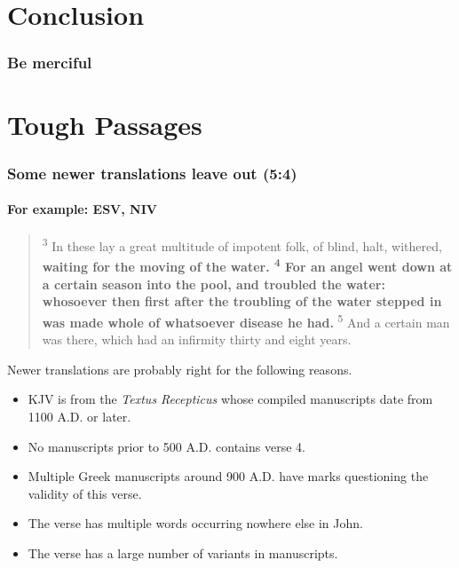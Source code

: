 \section*{Conclusion}
\begin{frame}
\frametitle{Be merciful}
\end{frame}

\section*{Tough Passages}
\begin{frame}
\frametitle{Some newer translations leave out (5:4)}
\framesubtitle{For example: ESV, NIV}

\footnotesize  
\begin{quote}
\textsuperscript{3} In these lay a great multitude of impotent folk, of blind, halt, withered, \textbf{waiting for the moving of the water. \textsuperscript{4} For an angel went down at a certain season into the pool, and troubled the water: whosoever then first after the troubling of the water stepped in was made whole of whatsoever disease he had.} \textsuperscript{5} And a certain man was there, which had an infirmity thirty and eight years.

\end{quote}
\normalsize 
Newer translations are probably right for the following reasons.
\begin{itemize}
\item KJV is from the \textit{Textus Recepticus} whose compiled manuscripts date from 1100 A.D. or later.
\item No manuscripts prior to 500 A.D. contains verse 4.
\item Multiple Greek manuscripts around 900 A.D. have marks questioning the validity of this verse.
\item The verse has multiple words occurring nowhere else in John.
\item The verse has a large number of variants in manuscripts.
\end{itemize}

\end{frame}
